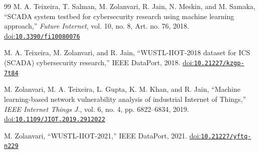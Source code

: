 \begin{thebibliography}{99}
M. A. Teixeira, T. Salman, M. Zolanvari, R. Jain, N. Meskin, and M. Samaka, ``SCADA system testbed for cybersecurity research using machine learning approach,'' \emph{Future Internet}, vol. 10, no. 8, Art. no. 76, 2018. \href{https://doi.org/10.3390/fi10080076}{doi:\nolinkurl{10.3390/fi10080076}}

M. A. Teixeira, M. Zolanvari, and R. Jain, ``WUSTL-IIOT-2018 dataset for ICS (SCADA) cybersecurity research,'' IEEE DataPort, 2018. \href{https://doi.org/10.21227/kzgp-7t84}{doi:\nolinkurl{10.21227/kzgp-7t84}}

M. Zolanvari, M. A. Teixeira, L. Gupta, K. M. Khan, and R. Jain, ``Machine learning-based network vulnerability analysis of industrial Internet of Things,'' \emph{IEEE Internet Things J.}, vol. 6, no. 4, pp. 6822--6834, 2019. \href{https://doi.org/10.1109/JIOT.2019.2912022}{doi:\nolinkurl{10.1109/JIOT.2019.2912022}}

M. Zolanvari, ``WUSTL-IIOT-2021,'' IEEE DataPort, 2021. \href{https://doi.org/10.21227/yftq-n229}{doi:\nolinkurl{10.21227/yftq-n229}}

\end{thebibliography}
\endgroup

